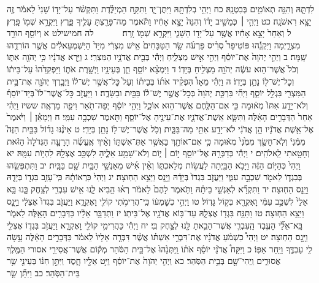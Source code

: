 \documentclass[twoside, openany, parskip=half, 11pt]{book}
\begin{document}
לִדְתָּ֑הּ וְהִנֵּ֥ה תְאוֹמִ֖ים בְּבִטְנָֽהּ׃ כח וַיְהִ֥י בְלִדְתָּ֖הּ וַיִּתֶּן־יָ֑ד וַתִּקַּ֣ח הַמְיַלֶּ֗דֶת וַתִּקְשֹׁ֨ר עַל־יָד֤וֹ שָׁנִי֙ לֵאמֹ֔ר זֶ֖ה יָצָ֥א רִאשֹׁנָֽה׃ כט וַיְהִ֣י ׀ כְּמֵשִׁ֣יב יָד֗וֹ וְהִנֵּה֙ יָצָ֣א אָחִ֔יו וַתֹּ֕אמֶר מַה־פָּרַ֖צְתָּ עָלֶ֣יךָ פָּ֑רֶץ וַיִּקְרָ֥א שְׁמ֖וֹ פָּֽרֶץ׃ ל וְאַחַר֙ יָצָ֣א אָחִ֔יו אֲשֶׁ֥ר עַל־יָד֖וֹ הַשָּׁנִ֑י וַיִּקְרָ֥א שְׁמ֖וֹ זָֽרַח׃
　　　לה חמישילט א וְיוֹסֵ֖ף הוּרַ֣ד מִצְרָ֑יְמָה וַיִּקְנֵ֡הוּ פּוֹטִיפַר֩ סְרִ֨יס פַּרְעֹ֜ה שַׂ֤ר הַטַּבָּחִים֙ אִ֣ישׁ מִצְרִ֔י מִיַּד֙ הַיִּשְׁמְעֵאלִ֔ים אֲשֶׁ֥ר הוֹרִדֻ֖הוּ שָֽׁמָּה׃ ב וַיְהִ֤י יְהֹוָה֙ אֶת־יוֹסֵ֔ף וַיְהִ֖י אִ֣ישׁ מַצְלִ֑יחַ וַיְהִ֕י בְּבֵ֖ית אֲדֹנָ֥יו הַמִּצְרִֽי׃ ג וַיַּ֣רְא אֲדֹנָ֔יו כִּ֥י יְהֹוָ֖ה אִתּ֑וֹ וְכֹל֙ אֲשֶׁר־ה֣וּא עֹשֶׂ֔ה יְהֹוָ֖ה מַצְלִ֥יחַ בְּיָדֽוֹ׃ ד וַיִּמְצָ֨א יוֹסֵ֥ף חֵ֛ן בְּעֵינָ֖יו וַיְשָׁ֣רֶת אֹת֑וֹ וַיַּפְקִדֵ֙הוּ֙ עַל־בֵּית֔וֹ וְכׇל־יֶשׁ־ל֖וֹ נָתַ֥ן בְּיָדֽוֹ׃ ה וַיְהִ֡י מֵאָז֩ הִפְקִ֨יד אֹת֜וֹ בְּבֵית֗וֹ וְעַל֙ כׇּל־אֲשֶׁ֣ר יֶשׁ־ל֔וֹ וַיְבָ֧רֶךְ יְהֹוָ֛ה אֶת־בֵּ֥ית הַמִּצְרִ֖י בִּגְלַ֣ל יוֹסֵ֑ף וַיְהִ֞י בִּרְכַּ֤ת יְהֹוָה֙ בְּכׇל־אֲשֶׁ֣ר יֶשׁ־ל֔וֹ בַּבַּ֖יִת וּבַשָּׂדֶֽה׃ ו וַיַּעֲזֹ֣ב כׇּל־אֲשֶׁר־לוֹ֮ בְּיַד־יוֹסֵף֒ וְלֹא־יָדַ֤ע אִתּוֹ֙ מְא֔וּמָה כִּ֥י אִם־הַלֶּ֖חֶם אֲשֶׁר־ה֣וּא אוֹכֵ֑ל וַיְהִ֣י יוֹסֵ֔ף יְפֵה־תֹ֖אַר וִיפֵ֥ה מַרְאֶֽה׃ ששיז וַיְהִ֗י אַחַר֙ הַדְּבָרִ֣ים הָאֵ֔לֶּה וַתִּשָּׂ֧א אֵֽשֶׁת־אֲדֹנָ֛יו אֶת־עֵינֶ֖יהָ אֶל־יוֹסֵ֑ף וַתֹּ֖אמֶר שִׁכְבָ֥ה עִמִּֽי׃ ח וַיְמָאֵ֓ן ׀ וַיֹּ֙אמֶר֙ אֶל־אֵ֣שֶׁת אֲדֹנָ֔יו הֵ֣ן אֲדֹנִ֔י לֹא־יָדַ֥ע אִתִּ֖י מַה־בַּבָּ֑יִת וְכֹ֥ל אֲשֶׁר־יֶשׁ־ל֖וֹ נָתַ֥ן בְּיָדִֽי׃ ט אֵינֶ֨נּוּ גָד֜וֹל בַּבַּ֣יִת הַזֶּה֮ מִמֶּ֒נִּי֒ וְלֹֽא־חָשַׂ֤ךְ מִמֶּ֙נִּי֙ מְא֔וּמָה כִּ֥י אִם־אוֹתָ֖ךְ בַּאֲשֶׁ֣ר אַתְּ־אִשְׁתּ֑וֹ וְאֵ֨יךְ אֶֽעֱשֶׂ֜ה הָרָעָ֤ה הַגְּדֹלָה֙ הַזֹּ֔את וְחָטָ֖אתִי לֵֽאלֹהִֽים׃ י וַיְהִ֕י כְּדַבְּרָ֥הּ אֶל־יוֹסֵ֖ף י֣וֹם ׀ י֑וֹם וְלֹא־שָׁמַ֥ע אֵלֶ֛יהָ לִשְׁכַּ֥ב אֶצְלָ֖הּ לִהְי֥וֹת עִמָּֽהּ׃ יא וַיְהִי֙ כְּהַיּ֣וֹם הַזֶּ֔ה וַיָּבֹ֥א הַבַּ֖יְתָה לַעֲשׂ֣וֹת מְלַאכְתּ֑וֹ וְאֵ֨ין אִ֜ישׁ מֵאַנְשֵׁ֥י הַבַּ֛יִת שָׁ֖ם בַּבָּֽיִת׃ יב וַתִּתְפְּשֵׂ֧הוּ בְּבִגְד֛וֹ לֵאמֹ֖ר שִׁכְבָ֣ה עִמִּ֑י וַיַּעֲזֹ֤ב בִּגְדוֹ֙ בְּיָדָ֔הּ וַיָּ֖נׇס וַיֵּצֵ֥א הַחֽוּצָה׃ יג וַיְהִי֙ כִּרְאוֹתָ֔הּ כִּֽי־עָזַ֥ב בִּגְד֖וֹ בְּיָדָ֑הּ וַיָּ֖נׇס הַחֽוּצָה׃ יד וַתִּקְרָ֞א לְאַנְשֵׁ֣י בֵיתָ֗הּ וַתֹּ֤אמֶר לָהֶם֙ לֵאמֹ֔ר רְא֗וּ הֵ֥בִיא לָ֛נוּ אִ֥ישׁ עִבְרִ֖י לְצַ֣חֶק בָּ֑נוּ בָּ֤א אֵלַי֙ לִשְׁכַּ֣ב עִמִּ֔י וָאֶקְרָ֖א בְּק֥וֹל גָּדֽוֹל׃ טו וַיְהִ֣י כְשׇׁמְע֔וֹ כִּֽי־הֲרִימֹ֥תִי קוֹלִ֖י וָאֶקְרָ֑א וַיַּעֲזֹ֤ב בִּגְדוֹ֙ אֶצְלִ֔י וַיָּ֖נׇס וַיֵּצֵ֥א הַחֽוּצָה׃ טז וַתַּנַּ֥ח בִּגְד֖וֹ אֶצְלָ֑הּ עַד־בּ֥וֹא אֲדֹנָ֖יו אֶל־בֵּיתֽוֹ׃ יז וַתְּדַבֵּ֣ר אֵלָ֔יו כַּדְּבָרִ֥ים הָאֵ֖לֶּה לֵאמֹ֑ר בָּֽא־אֵלַ֞י הָעֶ֧בֶד הָֽעִבְרִ֛י אֲשֶׁר־הֵבֵ֥אתָ לָּ֖נוּ לְצַ֥חֶק בִּֽי׃ יח וַיְהִ֕י כַּהֲרִימִ֥י קוֹלִ֖י וָאֶקְרָ֑א וַיַּעֲזֹ֥ב בִּגְד֛וֹ אֶצְלִ֖י וַיָּ֥נׇס הַחֽוּצָה׃ יט וַיְהִי֩ כִשְׁמֹ֨עַ אֲדֹנָ֜יו אֶת־דִּבְרֵ֣י אִשְׁתּ֗וֹ אֲשֶׁ֨ר דִּבְּרָ֤ה אֵלָיו֙ לֵאמֹ֔ר כַּדְּבָרִ֣ים הָאֵ֔לֶּה עָ֥שָׂה לִ֖י עַבְדֶּ֑ךָ וַיִּ֖חַר אַפּֽוֹ׃ כ וַיִּקַּח֩ אֲדֹנֵ֨י יוֹסֵ֜ף אֹת֗וֹ וַֽיִּתְּנֵ֙הוּ֙ אֶל־בֵּ֣ית הַסֹּ֔הַר מְק֕וֹם אֲשֶׁר־אֲסִירֵ֥י אסורי הַמֶּ֖לֶךְ אֲסוּרִ֑ים וַֽיְהִי־שָׁ֖ם בְּבֵ֥ית הַסֹּֽהַר׃ כא וַיְהִ֤י יְהֹוָה֙ אֶת־יוֹסֵ֔ף וַיֵּ֥ט אֵלָ֖יו חָ֑סֶד וַיִּתֵּ֣ן חִנּ֔וֹ בְּעֵינֵ֖י שַׂ֥ר בֵּית־הַסֹּֽהַר׃ כב וַיִּתֵּ֞ן שַׂ֤ר 
\end{document}
